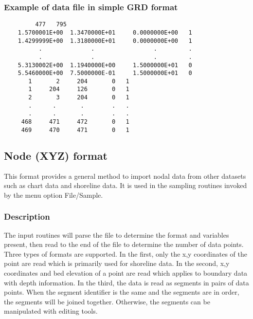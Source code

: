\documentclass{article}
\begin{document}
\subsubsection{Example of data file in simple GRD format}

\begin{small}
\begin{lstlisting}
         477   795
    1.5700001E+00  1.3470000E+01     0.0000000E+00   1  
    1.4299999E+00  1.3180000E+01     0.0000000E+00   1  
          .              .                 .         .
          .              .                 .         .
    5.3130002E+00  1.1940000E+00     1.5000000E+01   0  
    5.5460000E+00  7.5000000E-01     1.5000000E+01   0  
       1       2     204       0   1
       1     204     126       0   1
       2       3     204       0   1
       .      .       .        .   .
       .      .       .        .   .
     468     471     472       0   1
     469     470     471       0   1
\end{lstlisting}
\end{small}

\newpage
\subsection[Node (XYZ) format]{Node (XYZ) format}

This format provides a general method to import nodal data from other datasets such as chart data and shoreline data.
It is used in the sampling routines invoked by the menu option File/Sample.

\subsubsection[Description]{Description}

The input routines will parse the file to 
determine the format and variables present, then read to the end of the file to determine the number of data points. 
Three types of formats are supported. In the first, only the x,y coordinates of the point are read which is primarily used
for shoreline data.  In the second,  x,y coordinates and bed elevation of a point are read which applies to boundary data with
depth information. In the third, the data is read as segments in pairs of data points. When the segment identifier is the same
and the segments are in order,
the segments will be joined together. Otherwise, the segments can be manipulated with editing tools.\\
\end{document}
